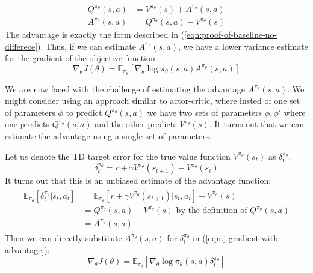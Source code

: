 \documentclass[journal, onecolumn, 12pt, draftclsnofoot]{IEEEtran}
\begin{document}
		\begin{align}
			\label{eqn:advantage}
				Q^{\pi_\theta}(s,a) &= V^{\pi_\theta}(s) + A^{\pi_\theta}(s,a) \\
				A^{\pi_\theta}(s,a)  &= Q^{\pi_\theta}(s,a) - V^{\pi_\theta}(s)
		\end{align}
		The advantage is exactly the form described in (\ref{eqn:proof-of-baseline-no-differece}). Thus, if we can estimate $A^{\pi_\theta}(s,a)$, we have a lower variance estimate for the gradient of the objective function.
		\begin{equation}
			\label{eqn:j-gradient-with-advantage}
			\nabla_\theta J(\theta) = \mathbb{E}_{\pi_\theta} \left[ \nabla_\theta \log \pi_\theta (s, a) A^{\pi_\theta}(s,a) \right]
		\end{equation}
		\par We are now faced with the challenge of estimating the advantage $A^{\pi_\theta}(s,a)$. We might consider using an approach similar to actor-critic, where insted of one set of parameters $\phi$ to predict $Q^{\pi_\theta}(s,a)$ we have two sets of parameters $\phi, \phi '$ where one predicts $Q^{\pi_\theta}(s,a)$ and the other predicts $V^{\pi_\theta}(s)$. It turns out that we can estimate the advantage using a single set of parameters.
		\par Let us denote the TD target error for the true value function $V^{\pi_\theta}(s_t)$ as $\delta_t^{\pi_\theta}$.
		\begin{equation}
			\label{eqn:td-target-error-true-v}
			\delta_t^{\pi_\theta} = r + \gamma V^{\pi_\theta}(s_{t+1}) - V^{\pi_\theta}(s_t)
		\end{equation}
		It turns out that this is an unbiased estimate of the advantage function:
		\begin{align}
			\begin{split}
				\mathbb{E}_{\pi_\theta} \left[ \delta_t^{\pi_\theta} \big\vert s_t, a_t \right] &= \mathbb{E}_{\pi_\theta} \left[ r + \gamma V^{\pi_\theta}(s_{t+1}) \big\vert s_t, a_t \right] - V^{\pi_\theta}(s) \\
				&= Q^{\pi_\theta}(s,a) - V^{\pi_\theta}(s)  \text{ by the definition of } Q^{\pi_\theta}(s,a) \\
				&= A^{\pi_\theta}(s,a )
			\end{split}
		\end{align}
		Then we can directly substitute $A^{\pi_\theta}(s,a)$ for $\delta_t^{\pi_\theta}$ in (\ref{eqn:j-gradient-with-advantage}):
		\begin{equation}
			\label{eqn:j-gradient-with-delta}
			\nabla_\theta J(\theta) = \mathbb{E}_{\pi_\theta} \left[ \nabla_\theta \log \pi_\theta (s, a) \delta_t^{\pi_\theta} \right]
		\end{equation}
\end{document}
